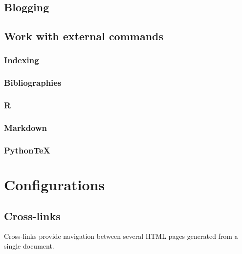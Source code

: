\documentclass{book}
\begin{document}


\section{Blogging}

\section{Work with external commands}
\subsection{Indexing}
\subsection{Bibliographies}
\subsection{R}
\subsection{Markdown}
\subsection{PythonTeX}






\chapter{Configurations}










\section{Cross-links}

Cross-links provide navigation between several HTML pages generated from a single document.
\end{document}

